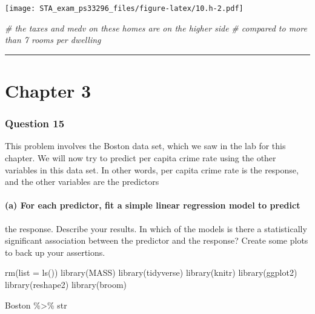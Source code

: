 \documentclass[
]{article}
\newenvironment{Shaded}{\begin{snugshade}}{\end{snugshade}}
\newcommand{\AttributeTok}[1]{\textcolor[rgb]{0.77,0.63,0.00}{#1}}
\newcommand{\CommentTok}[1]{\textcolor[rgb]{0.56,0.35,0.01}{\textit{#1}}}
\newcommand{\FunctionTok}[1]{\textcolor[rgb]{0.00,0.00,0.00}{#1}}
\newcommand{\NormalTok}[1]{#1}
\newcommand{\SpecialCharTok}[1]{\textcolor[rgb]{0.00,0.00,0.00}{#1}}
\begin{document}
\texttt{[image: STA\_exam\_ps33296\_files/figure-latex/10.h-2.pdf]}

\begin{Shaded}
\begin{Highlighting}[]
\CommentTok{\# the taxes and medv on these homes are on the higher side}
\CommentTok{\# compared to more than 7 rooms per dwelling}
\end{Highlighting}
\end{Shaded}

\begin{center}\rule{0.5\linewidth}{0.5pt}\end{center}

\hypertarget{chapter-3}{%
\section{Chapter 3}\label{chapter-3}}

\hypertarget{question-15}{%
\subsubsection{Question 15}\label{question-15}}

This problem involves the Boston data set, which we saw in the lab for
this chapter. We will now try to predict per capita crime rate using the
other variables in this data set. In other words, per capita crime rate
is the response, and the other variables are the predictors

\hypertarget{a-for-each-predictor-fit-a-simple-linear-regression-model-to-predict}{%
\paragraph{(a) For each predictor, fit a simple linear regression model
to
predict}\label{a-for-each-predictor-fit-a-simple-linear-regression-model-to-predict}}

the response. Describe your results. In which of the models is there a
statistically significant association between the predictor and the
response? Create some plots to back up your assertions.

\begin{Shaded}
\begin{Highlighting}[]
\FunctionTok{rm}\NormalTok{(}\AttributeTok{list =} \FunctionTok{ls}\NormalTok{())}
\FunctionTok{library}\NormalTok{(MASS)}
\FunctionTok{library}\NormalTok{(tidyverse)}
\FunctionTok{library}\NormalTok{(knitr)}
\FunctionTok{library}\NormalTok{(ggplot2)}
\FunctionTok{library}\NormalTok{(reshape2)}
\FunctionTok{library}\NormalTok{(broom)}

\NormalTok{Boston }\SpecialCharTok{\%\textgreater{}\%}\NormalTok{ str}
\end{Highlighting}
\end{Shaded}
\end{document}
